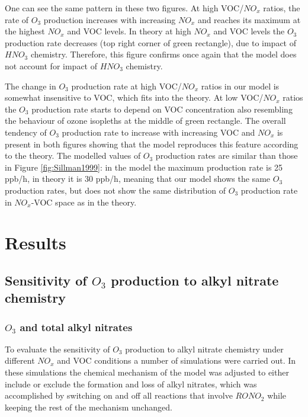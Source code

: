 \documentclass[11pt,a4paper]{article}
\begin{document}
One can see the same pattern in these two figures. At high VOC/$NO_x$ ratios, the rate of $O_3$ production increases with increasing $NO_x$ and reaches its maximum at the highest $NO_x$ and VOC levels. In theory at high $NO_x$ and VOC levels the $O_3$ production rate decreases (top right corner of green rectangle), due to impact of $HNO_3$ chemistry. Therefore, this figure confirms once again that the model does not account for impact of $HNO_3$ chemistry.

The change in $O_3$ production rate at high VOC/$NO_x$ ratios in our model is somewhat insensitive to VOC, which fits into the theory. At low VOC/$NO_x$ ratios the $O_3$ production rate starts to depend on VOC concentration also resembling the behaviour of ozone isopleths at the middle of green rectangle. The overall tendency of $O_3$ production rate to increase with increasing VOC and $NO_x$ is present in both figures showing that the model reproduces this feature according to the theory. The modelled values of $O_3$ production rates are similar than those in Figure \ref{fig:Sillman1999}: in the model the maximum production rate is 25 ppb/h, in theory it is 30 ppb/h, meaning that our model shows the same $O_3$ production rates, but does not show the same distribution of $O_3$ production rate in $NO_x$-VOC space as in the theory.

\section{Results} \label{sec:res}
\subsection{Sensitivity of $O_3$ production to alkyl nitrate chemistry}\label{sec:res_O3ANsensetivity}
\subsubsection{$O_3$ and total alkyl nitrates}

To evaluate the sensitivity of $O_3$ production to alkyl nitrate chemistry under different $NO_x$ and VOC conditions a number of simulations were carried out. In these simulations the chemical mechanism of the model was adjusted to either include or exclude the formation and loss of alkyl nitrates, which was accomplished by switching on and off all reactions that involve $RONO_2$ while keeping the rest of the mechanism unchanged. 
\end{document}
